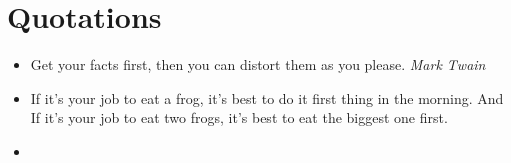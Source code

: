 \section{Quotations}
\begin{itemize}
  \item Get your facts first, then you can distort them as you please. \emph{Mark Twain}
  \item If it's your job to eat a frog, it's best to do it first thing in the morning. And If it's
    your job to eat two frogs, it's best to eat the biggest one first.
  \item
\end{itemize}
